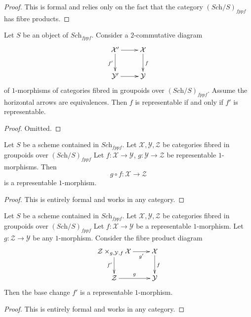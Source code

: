 \begin{proof}
This is formal and relies only on the fact that
the category $(\textit{Sch}/S)_{fppf}$ has fibre products.
\end{proof}

\begin{lemma}
\label{lemma-representable-morphism-equivalent}
Let $S$ be an object of $\textit{Sch}_{fppf}$.
Consider a $2$-commutative diagram
$$
\xymatrix{
\mathcal{X}' \ar[r] \ar[d]_{f'} & \mathcal{X} \ar[d]^f \\
\mathcal{Y}' \ar[r] & \mathcal{Y}
}
$$
of $1$-morphisms of categories fibred in groupoids over
$(\textit{Sch}/S)_{fppf}$.
Assume the horizontal arrows are equivalences.
Then $f$ is representable if and only if $f'$ is representable.
\end{lemma}

\begin{proof}
Omitted.
\end{proof}

\begin{lemma}
\label{lemma-composition-representable-transformations}
Let $S$ be a scheme contained in $\textit{Sch}_{fppf}$.
Let $\mathcal{X}, \mathcal{Y}, \mathcal{Z}$
be categories fibred in groupoids over $(\textit{Sch}/S)_{fppf}$
Let $f : \mathcal{X} \to \mathcal{Y}$, $g : \mathcal{Y} \to \mathcal{Z}$
be representable $1$-morphisms. Then
$$
g \circ f : \mathcal{X} \longrightarrow \mathcal{Z}
$$
is a representable $1$-morphism.
\end{lemma}

\begin{proof}
This is entirely formal and works in any category.
\end{proof}

\begin{lemma}
\label{lemma-base-change-representable-transformations}
Let $S$ be a scheme contained in $\textit{Sch}_{fppf}$.
Let $\mathcal{X}, \mathcal{Y}, \mathcal{Z}$
be categories fibred in groupoids over $(\textit{Sch}/S)_{fppf}$
Let $f : \mathcal{X} \to \mathcal{Y}$ be a representable $1$-morphism.
Let $g : \mathcal{Z} \to \mathcal{Y}$ be any $1$-morphism.
Consider the fibre product diagram
$$
\xymatrix{
\mathcal{Z} \times_{g, \mathcal{Y}, f} \mathcal{X} \ar[r]_-{g'} \ar[d]_{f'} &
\mathcal{X} \ar[d]^f \\
\mathcal{Z} \ar[r]^g & \mathcal{Y}
}
$$
Then the base change $f'$ is a representable $1$-morphism.
\end{lemma}

\begin{proof}
This is entirely formal and works in any category.
\end{proof}


